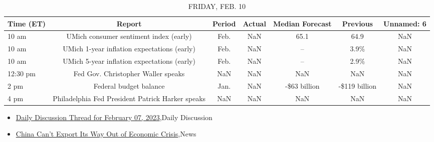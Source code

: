 \documentclass{article}%
\begin{document}
%


\begin{table}[htbp]%
\caption{FRIDAY, FEB. 10}%
\centering%
\begin{adjustbox}{width=1\textwidth}%
\begin{tabular}{lcccccc}
\toprule
Time (ET) &                                           Report & Period & Actual & Median Forecast &      Previous & Unnamed: 6 \\
\midrule
    10 am &           UMich consumer sentiment index (early) &   Feb. &    NaN &            65.1 &          64.9 &        NaN \\
    10 am &      UMich 1-year inflation expectations (early) &   Feb. &    NaN &              -- &          3.9\% &        NaN \\
    10 am &      UMich 5-year inflation expectations (early) &   Feb. &    NaN &              -- &          2.9\% &        NaN \\
 12:30 pm &               Fed Gov. Christopher Waller speaks &    NaN &    NaN &             NaN &           NaN &        NaN \\
     2 pm &                           Federal budget balance &   Jan. &    NaN &    -\$63 billion & -\$119 billion &        NaN \\
     4 pm & Philadelphia Fed President Patrick Harker speaks &    NaN &    NaN &             NaN &           NaN &        NaN \\
\bottomrule
\end{tabular}
%
\end{adjustbox}%
\end{table}

%
\begin{itemize}%
\item%
\href{https://reddit.com/r/wallstreetbets/comments/10vz3jm/daily\_discussion\_thread\_for\_february\_07\_2023/}{Daily Discussion Thread for February 07, 2023},Daily Discussion%
\item%
\href{https://reddit.com/r/Economics/comments/10vua2c/china\_cant\_export\_its\_way\_out\_of\_economic\_crisis/}{China Can't Export Its Way Out of Economic Crisis},News%
\end{itemize}%
\end{document}
